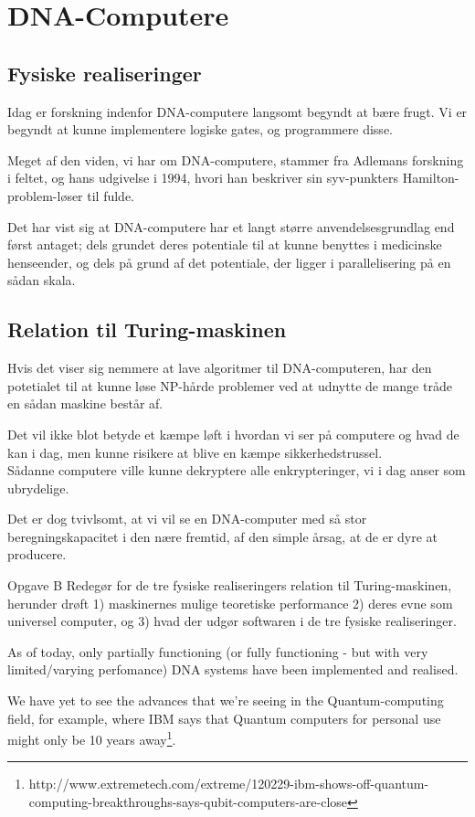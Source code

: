 
\section{DNA-Computere}

\subsection{Fysiske realiseringer}
Idag er forskning indenfor DNA-computere langsomt begyndt at bære frugt. Vi
er begyndt at kunne implementere logiske gates, og programmere disse.

Meget af den viden, vi har om DNA-computere, stammer fra Adlemans forskning i
feltet, og hans udgivelse i 1994, hvori han beskriver sin syv-punkters
Hamilton-problem-løser til fulde.

Det har vist sig at DNA-computere har et langt større anvendelsesgrundlag end
først antaget; dels grundet deres potentiale til at kunne benyttes i medicinske
henseender, og dels på grund af det potentiale, der ligger i parallelisering
på en sådan skala. 

\subsection{Relation til Turing-maskinen}
Hvis det viser sig nemmere at lave algoritmer til DNA-computeren, har den
potetialet til at kunne løse NP-hårde problemer ved at udnytte de mange tråde
en sådan maskine består af.

Det vil ikke blot betyde et kæmpe løft i hvordan vi ser på computere og
hvad de kan i dag, men kunne risikere at blive en kæmpe sikkerhedstrussel.\\
Sådanne computere ville kunne dekryptere alle enkrypteringer, vi i dag anser
som ubrydelige.

Det er dog tvivlsomt, at vi vil se en DNA-computer med så stor beregningskapacitet
i den nære fremtid, af den simple årsag, at de er dyre at producere.



Opgave B
Redegør for de tre fysiske realiseringers relation til Turing-maskinen, herunder drøft
1) maskinernes mulige teoretiske performance 2) deres evne som universel computer,
og 3) hvad der udgør softwaren i de tre fysiske realiseringer.

As of today, only partially functioning (or fully functioning - but with very
limited/varying perfomance) DNA systems have been implemented and realised.

We have yet to see the advances that we're seeing in the Quantum-computing
field, for example, where IBM says that Quantum computers for personal use might
only be 10 years away\footnote{http://www.extremetech.com/extreme/120229-ibm-shows-off-quantum-computing-breakthroughs-says-qubit-computers-are-close}.


